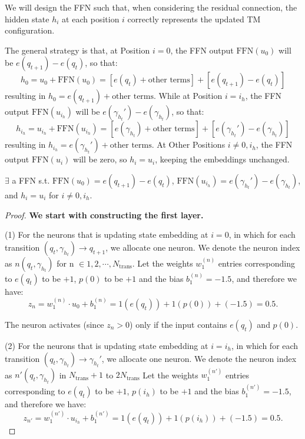 {We will design the FFN such that, when considering the residual connection, the hidden state \( h_i \) at each position \( i \) correctly represents the updated TM configuration.

The general strategy is that, at Position \( i = 0 \), the FFN output \( \text{FFN}(u_0) \) will be \( e(q_{t+1}) - e(q_t) \), so that:
  \[
  h_0 = u_0 + \text{FFN}(u_0) = [e(q_t) + \text{other terms}] + [e(q_{t+1}) - e(q_t)]
  \]
  resulting in \( h_0 = e(q_{t+1}) + \text{other terms} \).
While at Position \( i = i_h \), the FFN output \( \text{FFN}(u_{i_h}) \) will be \( e(\gamma_{h_t}') - e(\gamma_{h_t}) \), so that:
  \[
  h_{i_h} = u_{i_h} + \text{FFN}(u_{i_h}) = [e(\gamma_{h_t}) + \text{other terms}] + [e(\gamma_{h_t}') - e(\gamma_{h_t})]
  \]
  resulting in \(h_{i_h}= e(\gamma_{h_t}') + \text{other terms} \). At Other Positions \( i \neq 0, i_h \), the FFN output \( \text{FFN}(u_i) \) will be zero, so \( h_i = u_i \), keeping the embeddings unchanged.

\begin{lemma}
    \(\exists\) a FFN s.t.  \( \text{FFN}(u_0)= e(q_{t+1}) - e(q_t) \), \( \text{FFN}(u_{i_h}) =e(\gamma_{h_t}') - e(\gamma_{h_t}) \), and \( h_i = u_i\) for \( i \neq 0, i_h \).
\end{lemma}

\begin{proof}
   \textbf{ We start with constructing the first layer.}

(1) For the neurons that is updating state embedding at \( i = 0 \), in which for each transition \( (q_t, \gamma_{h_t}) \rightarrow q_{t+1} \), we allocate one neuron. We denote the neuron index as \( n(q_t, \gamma_{h_t}) \) for n \( \in1 ,2,\cdots, N_{\text{trans}} \). Let the weights \( w_1^{(n)} \) entries corresponding to  \( e(q_t) \) to be \( +1 \), \( p(0) \) to be \( +1 \) and the bias \( b_1^{(n)} = -1.5 \),
and therefore we have: \[
  z_n = w_1^{(n)} \cdot u_0 + b_1^{(n)} = 1 (e(q_t)) + 1 (p(0)) + (-1.5) = 0.5.
  \]

The neuron activates (since \( z_n > 0 \)) only if the input contains \( e(q_t) \) and \( p(0) \).

(2) For the neurons that is updating state embedding at \( i = i_h \), in which for each transition \( (q_t, \gamma_{h_t}) \rightarrow \gamma_{h_t}' \), we allocate one neuron.
 We denote the neuron index as \( n'(q_t, \gamma_{h_t}) \) in \( N_{\text{trans}} + 1 \) to \( 2N_{\text{trans}} \)
Let the weights \( w_1^{(n')} \) entries corresponding to \( e(q_t) \) to be \( +1 \), \( p(i_h) \) to be \( +1 \)
and the bias \( b_1^{(n')} = -1.5 \), and therefore we have:
  \[
  z_{n'} = w_1^{(n')} \cdot u_{i_h} + b_1^{(n')} = 1 (e(q_t)) + 1 (p(i_h)) + (-1.5) = 0.5.
  \]


\end{proof}}
